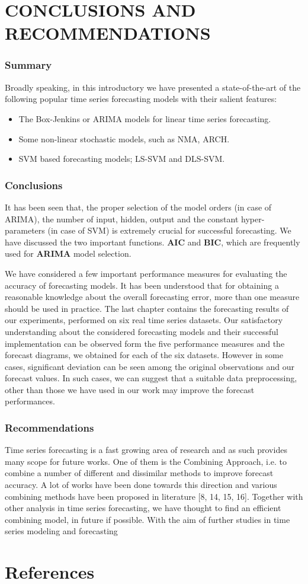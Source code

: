 \documentclass[10pt]{report}
\begin{document}
\begin{flushleft}
		\section{CONCLUSIONS AND RECOMMENDATIONS}
		\subsubsection{Summary}
			Broadly speaking, in this introductory we have presented a state-of-the-art of the following popular time series forecasting models with their salient features:
		\begin{itemize}
			\item  The Box-Jenkins or ARIMA models for linear time series forecasting. 
			\item Some non-linear stochastic models, such as NMA, ARCH. 
			\item SVM based forecasting models; LS-SVM and DLS-SVM.
		\end{itemize} 
		\subsubsection{ Conclusions}
		It has been seen that, the proper selection of the model orders (in case of ARIMA), the number of input, hidden, output  and the constant hyper-parameters (in case of SVM) is extremely crucial for successful forecasting. We have discussed the two important functions. \textbf{AIC} and \textbf{BIC}, which are frequently used for \textbf{ARIMA} model selection. 
	
		We have considered a few important performance measures for evaluating the accuracy of forecasting models. It has been understood that for obtaining a reasonable knowledge about the overall forecasting error, more than one measure should be used in practice. The last chapter contains the forecasting results of our experiments, performed on six real time series datasets. 
		Our satisfactory understanding about the considered forecasting models and their successful implementation can be observed form the five performance measures and the forecast diagrams, we obtained for each of the six datasets. However in some cases, significant deviation can be seen among the original observations and our forecast values. In such cases, we can suggest that a suitable data preprocessing, other than those we have used in our work may improve the forecast performances. 
		\subsubsection{Recommendations}
		Time series forecasting is a fast growing area of research and as such provides many scope for future works. One of them is the Combining Approach, i.e. to combine a number of different and dissimilar methods to improve forecast accuracy. A lot of works have been done towards this direction and various combining methods have been proposed in literature [8, 14, 15, 16]. 
		Together with other analysis in time series forecasting, we have thought to find an efficient combining model, in future if possible. With the aim of further studies in time series modeling and forecasting
		\section{References}
	\end{flushleft}
\end{document}
